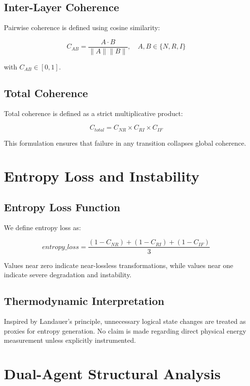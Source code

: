\documentclass[11pt]{article}
\begin{document}
\subsection{Inter-Layer Coherence}

Pairwise coherence is defined using cosine similarity:

\[
C_{AB} = \frac{A \cdot B}{\|A\|\|B\|}, \quad A,B \in \{N,R,I\}
\]

with $C_{AB} \in [0,1]$.

\subsection{Total Coherence}

Total coherence is defined as a strict multiplicative product:

\[
C_{total} = C_{NR} \times C_{RI} \times C_{IF}
\]

This formulation ensures that failure in any transition collapses global coherence.

\section{Entropy Loss and Instability}

\subsection{Entropy Loss Function}

We define entropy loss as:

\[
entropy\_loss = \frac{(1 - C_{NR}) + (1 - C_{RI}) + (1 - C_{IF})}{3}
\]

Values near zero indicate near-lossless transformations, while values near one indicate severe degradation and instability.

\subsection{Thermodynamic Interpretation}

Inspired by Landauer's principle, unnecessary logical state changes are treated as proxies for entropy generation. No claim is made regarding direct physical energy measurement unless explicitly instrumented.

\section{Dual-Agent Structural Analysis}
\end{document}
